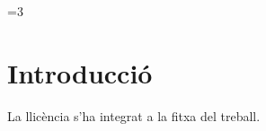 \documentclass[CAT,TFG,no-cover,no-toc]{P3CTeX}
\begin{document}
\ifnum\value{page}=3\relax\else
\fi
\section{Introducció}
La llicència s'ha integrat a la fitxa del treball.
\end{document}
